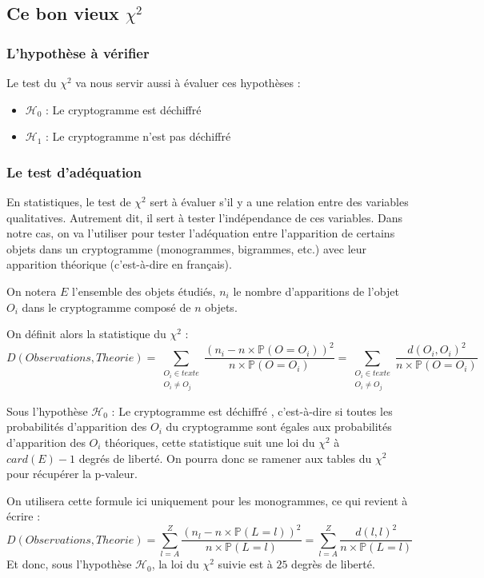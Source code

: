 \documentclass[a4paper, titlepage]{livret}
\begin{document}
\subsection{Ce bon vieux $\chi^{2}$}
\subsubsection{L'hypothèse à vérifier}
Le test du $\chi^{2}$ va nous servir aussi à évaluer ces hypothèses :
\begin{itemize}
 \item $\mathcal{H}_{0}$ : \og Le cryptogramme est déchiffré \fg{}
 \item $\mathcal{H}_{1}$  : \og Le cryptogramme n'est pas déchiffré \fg{}
\end{itemize}

\subsubsection{Le test d'adéquation}
En statistiques, le test de $\chi^{2}$ sert à évaluer s'il y a une relation entre des variables qualitatives.
Autrement dit, il sert à tester l'indépendance de ces variables.
Dans notre cas, on va l'utiliser pour tester l'adéquation entre l'apparition de certains objets dans un cryptogramme (monogrammes, bigrammes, etc.) avec leur apparition théorique (c'est-à-dire en français).

On notera $E$ l'ensemble des objets étudiés, $n_{i}$ le nombre d'apparitions de l'objet $O_{i}$ dans le cryptogramme composé de $n$ objets.

On définit alors la statistique du $\chi^{2}$ : 
\[D(Observations, Theorie) = \sum \limits_{\substack{{O_{i} \in texte} \\ O_{i} \neq O_{j}}}  \frac{(n_{i} - n \times \mathbb{P}(O = O_{i}))^{2}}{n \times \mathbb{P}(O = O_{i})} = \sum \limits_{\substack{{O_{i} \in texte} \\ O_{i} \neq O_{j}}}  \frac{d(O_{i},O_{i})^{2}}{n \times \mathbb{P}(O = O_{i})} \]

Sous l'hypothèse $\mathcal{H}_{0}$ : \og Le cryptogramme est déchiffré \fg{}, c'est-à-dire si toutes les probabilités d'apparition des $O_{i}$ du cryptogramme sont égales aux probabilités d'apparition des $O_{i}$ théoriques, cette statistique suit une loi du $\chi^{2}$ à $card(E) - 1$ degrés de liberté.
On pourra donc se ramener aux tables du $\chi^{2}$ pour récupérer la p-valeur.

On utilisera cette formule ici uniquement pour les monogrammes, ce qui revient à écrire : 
\[D(Observations, Theorie) = \sum_{l = A}^{Z}  \frac{(n_{l} - n \times \mathbb{P}(L = l))^{2}}{n \times \mathbb{P}(L = l)} = \sum_{l = A}^{Z}  \frac{d(l,l)^{2}}{n \times \mathbb{P}(L = l)}\]
Et donc, sous l'hypothèse $\mathcal{H}_{0}$, la loi du $\chi^{2}$ suivie est à $25$ degrès de liberté.
\end{document}
